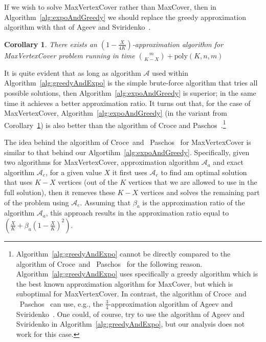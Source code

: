 \documentclass[11pt]{article}
\newcommand{\poly}{{\mathrm{poly}}}
\newtheorem{corollary}[theorem]{Corollary}
\newcommand{\calA}{{{\mathcal{A}}}}
\begin{document}
If we wish to solve MaxVertexCover rather than MaxCover, then in
Algorithm~\ref{alg:expoAndGreedy} we should replace the greedy
approximation algorithm with that of Ageev and
Sviridenko~\cite{age-svi:b:covers}.

\begin{corollary}\label{alg5:maxvertexcover}
There exists an $\left(1 - \frac{X}{4K}\right)$-approximation algorithm for MaxVertexCover problem running in time ${m \choose K-X} + \poly(K,n,m)$
\end{corollary}

It is quite evident that as long as algorithm $\calA$ used within
Algorithm~\ref{alg:greedyAndExpo} is the simple brute-force algorithm
that tries all possible solutions, then
Algorithm~\ref{alg:expoAndGreedy} is superior; in the same time it
achieves a better approximation ratio. It turns out that, for the case
of MaxVertexCover, Algorithm~\ref{alg:expoAndGreedy} (in the variant
from Corollary~\ref{alg5:maxvertexcover}) is also better than the
algorithm of Croce and
Paschos~\cite{cro-pas:j:cover}.\footnote{Algorithm~\ref{alg:greedyAndExpo}
  cannot be directly compared to the algorithm of Croce~and
  ~Paschos~\cite{cro-pas:j:cover} for the following reason.
  Algorithm~\ref{alg:greedyAndExpo} uses specifically a greedy
  algorithm which is the best known approximation algorithm for
  MaxCover, but which is suboptimal for MaxVertexCover. In contrast,
  the algorithm of Croce~and ~Paschos~\cite{cro-pas:j:cover} can use,
  e.g., the $\frac{3}{4}$-approximation algorithm of Ageev and
  Sviridenko~\cite{age-svi:b:covers}. One could, of course, try to use
  the algorithm of Ageev and Sviridenko in
  Algorithm~\ref{alg:greedyAndExpo}, but our analysis does not work
  for this case.}

The idea behind the algorithm of Croce~and
~Paschos~\cite{cro-pas:j:cover} for MaxVertexCover is similar to that
behind our Algortihm~\ref{alg:expoAndGreedy}.  Specifically, given two
algorithms for MaxVertexCover, approximation algorithm $\calA_a$ and
exact algorithm $\calA_e$, for a given value $X$ it first uses
$\calA_{e}$ to find am optimal solution that uses $K-X$ vertices (out
of the $K$ vertices that we are allowed to use in the full solution),
then it remeves these $K-X$ vertices and solves the remaining part of
the problem using $\calA_e$.  Assuming that $\beta_{a}$ is the
approximation ratio of the algorithm $\calA_{a}$, this approach
results in the approximation ratio equal to $\left(\frac{X}{K} +
  \beta_{a}\left(1 - \frac{X}{K}\right)^2\right)$.
\end{document}
